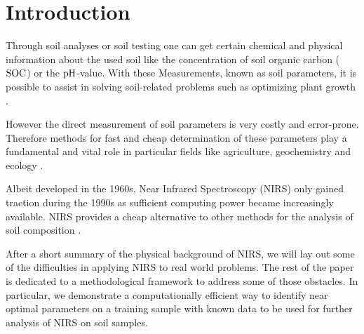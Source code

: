 \section{Introduction}
\label{sec:introduction}
	
	Through soil analyses or soil testing one can get certain chemical and physical information about the used soil like the concentration of soil organic carbon ($\mathrm{SOC}$) or the $\mathrm{pH}$-value.
	With these Measurements, known as soil parameters, it is possible to assist in solving soil-related problems such as optimizing plant growth \cite[1-3]{mclaughlin:99a}.
	
	However the direct measurement of soil parameters is very costly and error-prone.
	Therefore methods for fast and cheap determination of these parameters play a fundamental and vital role in particular fields like agriculture, geochemistry and ecology \cite{ludwig:01a}.

	Albeit developed in the 1960s, Near Infrared Spectroscopy (NIRS) only gained traction during the 1990s as sufficient computing power became increasingly available.
	NIRS provides a cheap alternative to other methods for the analysis of soil composition \cite[247]{agelet:10a}.

	After a short summary of the physical background of NIRS, we will lay out some of the difficulties in applying NIRS to real world problems.
	The rest of the paper is dedicated to a methodological framework to address some of those obstacles.
	In particular, we demonstrate a computationally efficient way to identify near optimal parameters on a training sample with known data to be used for further analysis of NIRS on soil samples.

